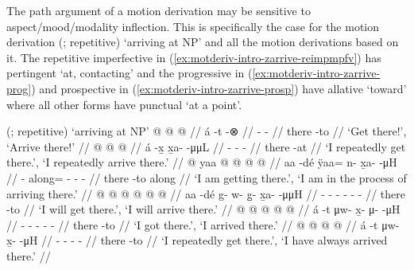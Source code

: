 \documentclass[12pt,letterpaper,oneside,article]{memoir}
\begin{document}
The path argument of a motion derivation may be sensitive to aspect/mood/modality inflection.
This is specifically the case for the motion derivation  (;  repetitive) ‘arriving at NP’ and all the motion derivations based on it.
The repetitive imperfective in (\ref{ex:motderiv-intro-zarrive-reimpmpfv}) has pertingent  ‘at, contacting’ and the progressive in (\ref{ex:motderiv-intro-zarrive-prog}) and prospective in (\ref{ex:motderiv-intro-zarrive-prosp}) have allative  ‘toward’ where all other forms have punctual  ‘at a point’.

\pex\label{ex:motderiv-intro-zarrive}%
\a\label{ex:motderiv-intro-zarrive-deriv}%
%
	 (;  repetitive) ‘arriving at NP’
\a\label{ex:motderiv-intro-zarrive-imp}%
%
\begingl
	\gla	{} @ {}  @ {} @ {} //
	\glb	á -t {}  -⊗ //
	\glc	{} - \·  - //
	\gld	there -to  {} {} //
	\glft	‘Get there!’, ‘Arrive there!’
		//
\endgl
\a\label{ex:motderiv-intro-zarrive-reimpmpfv}%
%
\begingl
	\gla	{} @ {}  @ {} @ {} //
	\glb	á -x̱ x̱a-  -μμL //
	\glc	{} - -  - //
	\gld	there -at  {} {} //
	\glft	‘I repeatedly get there.’, ‘I repeatedly arrive there.’
		//
\endgl
\a\label{ex:motderiv-intro-zarrive-prog}%
%
\begingl
	\gla	{} @ {} yaa @  @ {} @ {} @ {} //
	\glb	aa -dé ÿaa= n- x̱a-  -μH //
	\glc	{} - along= - -  - //
	\gld	there -to along  {} {} {} //
	\glft	‘I am getting there.’, ‘I am in the process of arriving there.’
		//
\endgl
\a\label{ex:motderiv-intro-zarrive-prosp}%
%
\begingl
	\gla	{} @ {}  @ {} @ {} @ {} @ {} @ {} //
	\glb	aa -dé g- w- g̱- x̱a-  -μμH //
	\glc	{} - - - - -  - //
	\gld	there -to  {} {} {} {} {} //
	\glft	‘I will get there.’, ‘I will arrive there.’
		//
\endgl
\a\label{ex:motderiv-intro-zarrive-pfv}%
%
\begingl
	\gla	{} @ {}  @ {} @ {} @ {} @ {} //
	\glb	á -t μw- x̱- μ-  -μH //
	\glc	{} - - - -  - //
	\gld	there -to  {} {} {} {} //
	\glft	‘I got there.’, ‘I arrived there.’
		//
\endgl
\a\label{ex:motderiv-intro-zarrive-hab}%
%
\begingl
	\gla	{} @ {}  @ {} @ {} @ {} //
	\glb	á -t μw- x̱-  -μH //
	\glc	{} - - -   - //
	\gld	there -to  {} {} {} //
	\glft	‘I repeatedly get there.’, ‘I have always arrived there.’
		//
\endgl
\xe
\end{document}
